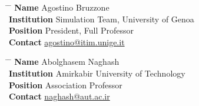 \documentclass[10pt]{article} %
\begin{document}
\parbox{0.5\textwidth}{ %
\begin{tabbing}
\hspace{2.75cm} \= \hspace{4cm} \= \kill %
{\bf Name} \> Agostino Bruzzone \\ %
{\bf Institution} \>  Simulation Team, University of Genoa \\ %
{\bf Position} \> President, Full Professor\\ %
{\bf Contact} \> \href{mailto:agostino@itim.unige.it}{agostino@itim.unige.it} %
\end{tabbing}}
\hfill %
\parbox{0.5\textwidth}{ %
\begin{tabbing}
\hspace{2.75cm} \= \hspace{4cm} \= \kill %
{\bf Name} \> Abolghasem Naghash\\ %
{\bf Institution} \> Amirkabir University of Technology\\ %
{\bf Position} \>  Association Professor \\ %
{\bf Contact} \> \href{mailto:naghash@aut.ac.ir}{naghash@aut.ac.ir} %
\end{tabbing}}

\end{document}
